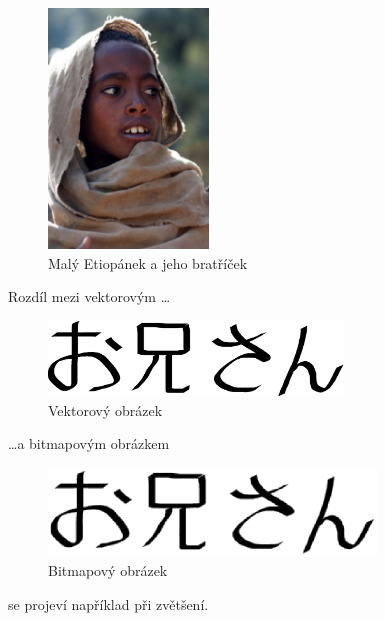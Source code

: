 \documentclass[11pt]{article}
\begin{document}
\begin{figure}[hb]
    \centering
    \includegraphics[width=4.25cm]{etiopan.eps}\hspace{-0.1cm}
    \caption{Malý Etiopánek a jeho bratříček}
    \label{fig:etiopanci}
\end{figure}

Rozdíl mezi vektorovým \ldots
\begin{figure}[H]
    \centering
    \includegraphics[width=7.8cm]{oniisan.eps}
    \caption{Vektorový obrázek}
    \label{fig:vektorovy}
\end{figure}
\noindent \ldots a bitmapovým obrázkem
\begin{figure}[H]
    \centering
    \includegraphics[width=8.7cm]{oniisan2.eps}
    \caption{Bitmapový obrázek}
    \label{fig:bitmapovy}
\end{figure}
\noindent se projeví například při zvětšení.
\end{document}
